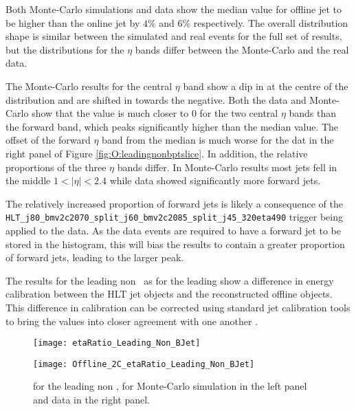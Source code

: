 	Both Monte-Carlo simulations and data show the median value for offline jet \pt to be higher than the online jet by $4\%$ and $6\%$ respectively. The overall distribution shape is similar between the simulated and real events for the full set of results, but the distributions for the $\eta$ bands differ between the Monte-Carlo and the real data.

	The Monte-Carlo results for the central $\eta$ band show a dip in \pt at the centre of the distribution and are shifted in \dptpt towards the negative. Both the data and Monte-Carlo show that the \dptpt value is much closer to 0 for the two central $\eta$ bands than the forward band, which peaks significantly higher than the median \dptpt value. The offset of the forward $\eta$ band from the median is much worse for the dat in the right panel of Figure \ref{fig:O:leadingnonbptslice}. In addition, the relative proportions of the three $\eta$ bands differ. In Monte-Carlo results most jets fell in the middle $1<|\eta|<2.4$ while data showed significantly more forward jets.

	\newpage
	The relatively increased proportion of forward jets is likely a consequence of the \texttt{HLT\_j80\_\-bmv2c2070\_split\_\-j60\_bmv2c2085\_split\_j45\_320eta490} trigger being applied to the data. As the data events are required to have a forward jet to be stored in the histogram, this will bias the results to contain a greater proportion of forward jets, leading to the larger peak.

	The \dptpt results for the leading non \bjet\ as for the leading \bjet show a difference in energy calibration between the HLT jet objects and the reconstructed offline objects. This difference in calibration can be corrected using standard jet calibration tools to bring the \pt values into closer agreement with one another \cite{JES, jetcalib}.

	\begin{figure}[h]
		\centering
		\begin{minipage}[h]{0.47\linewidth}
			\texttt{[image: etaRatio\_Leading\_Non\_BJet]}

		\end{minipage}
		\begin{minipage}[h]{0.47\linewidth}
			\texttt{[image: Offline\_2C\_etaRatio\_Leading\_Non\_BJet]}
		\end{minipage}
		\caption{\dee for the leading non \bjet, for Monte-Carlo simulation in the left panel and data in the right panel.}
		\label{fig:O:leadingnonbeta}
	\end{figure}


